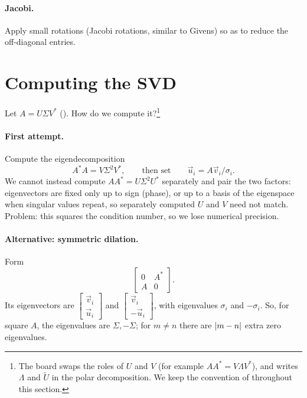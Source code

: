 \paragraph{Jacobi.} Apply small rotations (Jacobi rotations, similar to Givens) so as to reduce the off-diagonal entries.

\section{Computing the SVD}
\label{sec:computing-svd}

Let $A = U\Sigma V^\ast$ (). How do we compute it?\footnote{The board swaps the roles of $U$ and $V$ (for example $AA^\ast = V\Lambda V^\ast$), and writes $\Lambda$ and $\tilde{U}$ in the polar decomposition. We keep the convention of  throughout this section.}

\paragraph{First attempt.} Compute the eigendecomposition
\begin{equation}
  A^\ast A = V\Sigma^2V^\ast,
  \qquad\text{then set}\qquad
  \vec{u}_i = A\vec{v}_i/\sigma_i.
\end{equation}
We cannot instead compute $AA^\ast = U\Sigma^2U^\ast$ separately and pair the two factors: eigenvectors are fixed only up to sign (phase), or up to a basis of the eigenspace when singular values repeat, so separately computed $U$ and $V$ need not match. Problem: this squares the condition number, so we lose numerical precision.

\paragraph{Alternative: symmetric dilation.} Form
\begin{equation}
  \begin{bmatrix} 0 & A^\ast \\ A & 0 \end{bmatrix}.
\end{equation}
Its eigenvectors are $\begin{bmatrix} \vec{v}_i \\ \vec{u}_i \end{bmatrix}$ and $\begin{bmatrix} \vec{v}_i \\ -\vec{u}_i \end{bmatrix}$, with eigenvalues $\sigma_i$ and $-\sigma_i$. So, for square $A$, the eigenvalues are $\Sigma, -\Sigma$; for $m \ne n$ there are $\left\lvert m - n \right\rvert$ extra zero eigenvalues.

